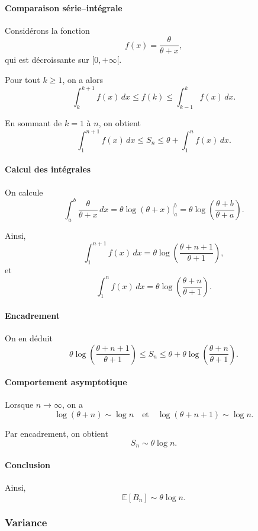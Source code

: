 \documentclass[12pt, a4paper]{article}
\theoremstyle{definition}
\theoremstyle{plain}
\begin{document}
\paragraph{Comparaison série–intégrale}

Considérons la fonction
\[
f(x) = \frac{\theta}{\theta + x},
\]
qui est décroissante sur $[0,+\infty[$.

Pour tout $k \geq 1$, on a alors
\[
\int_k^{k+1} f(x)\,dx \leq f(k) \leq \int_{k-1}^k f(x)\,dx.
\]

En sommant de $k=1$ à $n$, on obtient
\[
\int_1^{n+1} f(x)\,dx \leq S_n \leq \theta + \int_1^n f(x)\,dx.
\]

\paragraph{Calcul des intégrales}

On calcule
\[
\int_a^b \frac{\theta}{\theta + x}\,dx
= \theta \log(\theta + x)\Big|_a^b
= \theta \log\left(\frac{\theta + b}{\theta + a}\right).
\]

Ainsi,
\[
\int_1^{n+1} f(x)\,dx
= \theta \log\left(\frac{\theta + n + 1}{\theta + 1}\right),
\]
et
\[
\int_1^n f(x)\,dx
= \theta \log\left(\frac{\theta + n}{\theta + 1}\right).
\]

\paragraph{Encadrement}

On en déduit
\[
\theta \log\left(\frac{\theta + n + 1}{\theta + 1}\right)
\leq S_n
\leq
\theta + \theta \log\left(\frac{\theta + n}{\theta + 1}\right).
\]

\paragraph{Comportement asymptotique}

Lorsque $n \to \infty$, on a
\[
\log(\theta + n) \sim \log n
\quad \text{et} \quad
\log(\theta + n + 1) \sim \log n.
\]

Par encadrement, on obtient
\[
S_n \sim \theta \log n.
\]

\paragraph{Conclusion}

Ainsi,
\[
\mathbb{E}[B_n] \sim \theta \log n.
\]

\subsubsection*{Variance}
\end{document}
